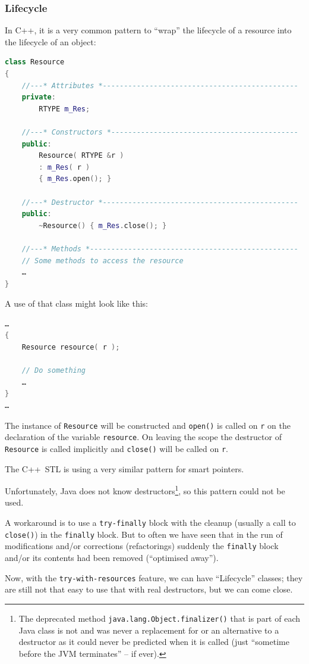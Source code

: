 \documentclass[11pt,a4paper, titlepage, parskip=half, headsepline, footsepline, cleardoublepage=current, headheight=1cm]{scrbook}
\begin{document}
\subsubsection{Lifecycle}\label{sec:Lifecycle}
In C++, it is a very common pattern to “wrap” the lifecycle of a resource into the lifecycle of an object:
\begin{lstlisting}[language=C++]
class Resource
{
    //---* Attributes *----------------------------------------------
    private:
        RTYPE m_Res;

    //---* Constructors *--------------------------------------------
    public:
        Resource( RTYPE &r )
        : m_Res( r )
        { m_Res.open(); }

    //---* Destructor *----------------------------------------------
    public:
        ~Resource() { m_Res.close(); }

    //---* Methods *-------------------------------------------------
    // Some methods to access the resource
    …
}
\end{lstlisting}
A use of that class might look like this:
\begin{lstlisting}[language=c++]
…
{
    Resource resource( r );

    // Do something
    …
}
…
\end{lstlisting}
The instance of \lstinline|Resource| will be constructed and \lstinline|open()| is called on \lstinline|r| on the declaration of the variable \lstinline|resource|. On leaving the scope the destructor of \lstinline|Resource| is called implicitly and \lstinline|close()| will be called on \lstinline|r|.

The C++~STL is using a very similar pattern for smart pointers.

Unfortunately, Java does not know destructors\footnote{The deprecated method \lstinline|java.lang.Object.finalizer()| that is part of each Java class is not and was never a replacement for or an alternative to a destructor as it could never be predicted when it is called (just “sometime before the JVM terminates” – if ever).}, so this pattern could not be used.

A workaround is to use a \lstinline|try-finally| block with the cleanup (usually a call to \lstinline|close()|) in the \lstinline|finally| block. But to often we have seen that in the run of modifications and/or corrections (refactorings) suddenly the \lstinline|finally| block and/or its contents had been removed (“optimised away”).

Now, with the \lstinline|try-with-resources| feature, we can have “Lifecycle” classes; they are still not that easy to use that with real destructors, but we can come close.
\end{document}
